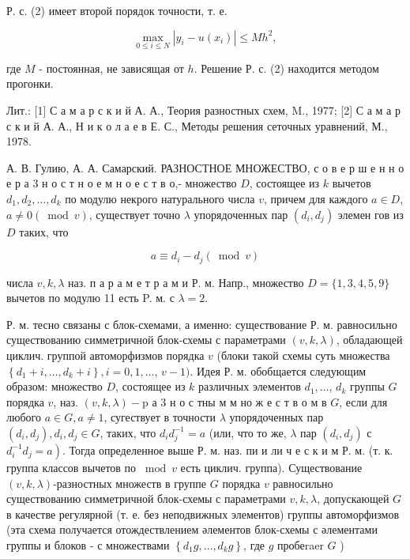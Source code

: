 \documentclass[10pt]{article}
\begin{document}
Р. с. (2) имеет второй порядок точности, т. е.



\[

\max _{0 \leqslant i \leqslant N}\left|y_{i}-u\left(x_{i}\right)\right| \leqslant M h^{2},

\]



где $M$ - постоянная, не зависящая от $h$. Решение Р. с. (2) находится методом прогонки.



Лит.: [1] С а м а р с к и й А. А., Теория разностных схем, M., 1977; [2] С а м а р с к и й А. А., Н и к о л а е в Е. С., Методы решения сеточных уравнений, М., 1978.



А. В. Гулию, А. А. Самарский. РАЗНОСТНОЕ МНОЖЕСТВО, с о в е р ш $е$ н н о е р а 3 н о с т н о е м н о е с т в о,- множество $D$, состоящее из $k$ вычетов $d_{1}, d_{2}, \ldots, d_{k}$ по модулю некрого натурального числа $v$, причем для каждого $a \in D$, $a \neq 0(\bmod v)$, существует точно $\lambda$ упорядоченных пар $\left(d_{i}, d_{j}\right)$ элемен гов из $D$ таких, что



\[

a \equiv d_{i}-d_{j}(\bmod v)

\]



числа $v, k, \lambda$ наз. п а р а м е т р а м и Р. м. Напр., множество $D=\{1,3,4,5,9\}$ вычетов по модулю 11 есть P. м. с $\lambda=2$.



Р. м. тесно связаны с блок-схемами, а именно: существование Р. м. равносильно существованию симметричной блок-схемы с параметрами $(v, k, \lambda)$, обладающей циклич. группой автоморфизмов порядка $v$ (блоки такой схемы суть множества $\left\{d_{1}+i, \ldots, d_{k}+i\right\}, i=0,1, \ldots$, $v-1)$. Идея Р. м. обобщается следующим образом: множество $D$, состоящее из $k$ различных элементов $d_{1}, \ldots$, $d_{k}$ группы $G$ порядка $v$, наз. $(v, k, \lambda)-\mathrm{p}$ а 3 н о с тны м м но ж е с т в о м в $G$, если для любого $a \in G, a \neq 1$, сугествует в точности $\lambda$ упорядоченных пар $\left(d_{i}, d_{j}\right), d_{i}, d_{j} \in G$, таких, что $d_{i} d_{j}^{-1}=a$ (или, что то же, $\lambda$ пар $\left(d_{i}, d_{j}\right)$ с $\left.d_{i}^{-1} d_{j}=a\right)$. Тогда определенное выше Р. м. наз. пи и ли ч е с к и м Р. м. (т. к. группа классов вычетов по $\bmod v$ есть циклич. группа). Существование $(v, k, \lambda)$-разностных множеств в группе $G$ порядка $v$ равносильно существованию симметричной блок-схемы с параметрами $v, k, \lambda$, допускающей $G$ в качестве регулярной (т. е. без неподвижных элементов) группы автоморфизмов (эта схема получается отождествлением әлементов блок-схемы с әлементами группы и блоков - с множествами $\left\{d_{1} g, \ldots, d_{k} g\right\}$, где $g$ пробеraer $G$ )
\end{document}
